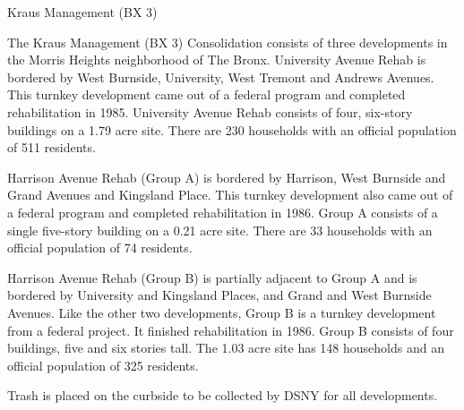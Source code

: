 Kraus Management (BX 3)\par \vspace{.7\baselineskip}The Kraus Management (BX 3) Consolidation consists of three developments in the Morris Heights neighborhood of The Bronx. University Avenue Rehab is bordered by West Burnside, University, West Tremont and Andrews Avenues. This turnkey development came out of a federal program and completed rehabilitation in 1985. University Avenue Rehab consists of four, six-story buildings on a 1.79 acre site. There are 230 households with an official population of 511 residents. \par \vspace{.7\baselineskip}Harrison Avenue Rehab (Group A) is bordered by Harrison, West Burnside and Grand Avenues and Kingsland Place. This turnkey development also came out of a federal program and completed rehabilitation in 1986. Group A consists of a single five-story building on a 0.21 acre site. There are 33 households with an official population of 74 residents.\par \vspace{.7\baselineskip}Harrison Avenue Rehab (Group B) is partially adjacent to Group A and is bordered by University and Kingsland Places, and Grand and West Burnside Avenues. Like the other two developments, Group B is a turnkey development from a federal project. It finished rehabilitation in 1986. Group B consists of four buildings, five and six stories tall. The 1.03  acre site has 148 households and an official population of 325 residents.\par \vspace{.7\baselineskip}Trash is placed on the curbside to be collected by DSNY for all developments.